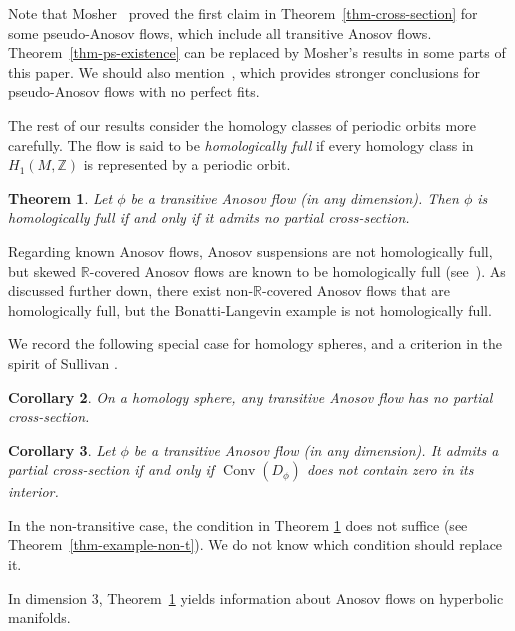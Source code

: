 \documentclass[colorinlistoftodos,12pt]{article}
\newcommand{\RR}{\mathbb{R}}
\newcommand{\ZZ}{\mathbb{Z}}
\DeclareMathOperator{\conv}{Conv}
\theoremstyle{colorplain}
\numberwithin{theorem}{section}
\newtheorem{maintheorem}{Theorem}
\newtheorem{maincorollary}[maintheorem]{Corollary}
\theoremstyle{colorremarkbis}
\theoremstyle{colorremark}
\theoremstyle{colordefinition}
\begin{document}
Note that Mosher~\cite{Mosher1989,Mosher1990} proved the first claim in Theorem~\ref{thm-cross-section} for some pseudo-Anosov flows, which include all transitive Anosov flows. Theorem~\ref{thm-ps-existence} can be replaced by Mosher's results in some parts of this paper. We should also mention~\cite{Landry2024}, which provides stronger conclusions for pseudo-Anosov flows with no perfect fits.


The rest of our results consider the homology classes of periodic orbits more carefully. The flow is said to be \emph{homologically full} if every homology class in $H_1(M,\ZZ)$ is represented by a periodic orbit. 

\begin{maintheorem}\label{thm-hom-full-section}
	Let $\phi$ be a transitive Anosov flow (in any dimension). Then $\phi$ is homologically full if and only if it admits no partial cross-section. %
\end{maintheorem} 

Regarding known Anosov flows, Anosov suspensions are not homologically full, but skewed $\RR$-covered Anosov flows are known to be homologically full (see~\cite[Lemma 5]{marty2025skewed}). As discussed further down, there exist non-$\RR$-covered Anosov flows that are homologically full, but the Bonatti-Langevin example is not homologically full.

We record the following special case for homology spheres, and a criterion in the spirit of Sullivan \cite{Sullivan1976}.

\begin{maincorollary}
	On a homology sphere, any transitive Anosov flow has no partial cross-section.
\end{maincorollary}

\begin{maincorollary}
	Let $\phi$ be a transitive Anosov flow (in any dimension). It admits a partial cross-section if and only if $\conv(D_\phi)$ does not contain zero in its interior.
\end{maincorollary}

In the non-transitive case, the condition in Theorem \ref{thm-hom-full-section} does not suffice (see Theorem~\ref{thm-example-non-t}). We do not know which condition should replace it.

\vspace{\baselineskip}

In dimension 3, Theorem~\ref{thm-hom-full-section} yields information about Anosov flows on hyperbolic manifolds.
\end{document}
